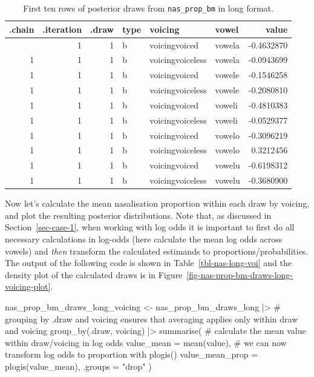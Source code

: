 \documentclass[
  authoryear,
  preprint,
  3p]{elsarticle}
\newenvironment{Shaded}{\begin{snugshade}}{\end{snugshade}}
\newcommand{\AttributeTok}[1]{\textcolor[rgb]{0.40,0.45,0.13}{#1}}
\newcommand{\CommentTok}[1]{\textcolor[rgb]{0.37,0.37,0.37}{#1}}
\newcommand{\FunctionTok}[1]{\textcolor[rgb]{0.28,0.35,0.67}{#1}}
\newcommand{\NormalTok}[1]{\textcolor[rgb]{0.00,0.23,0.31}{#1}}
\newcommand{\OtherTok}[1]{\textcolor[rgb]{0.00,0.23,0.31}{#1}}
\newcommand{\SpecialCharTok}[1]{\textcolor[rgb]{0.37,0.37,0.37}{#1}}
\newcommand{\StringTok}[1]{\textcolor[rgb]{0.13,0.47,0.30}{#1}}
\begin{document}
\begin{longtable}[]{@{}rrrlllr@{}}

\caption{\label{tbl-nas-draws}First ten rows of posterior draws from
\texttt{nas\_prop\_bm} in long format.}

\tabularnewline

\toprule\noalign{}
.chain & .iteration & .draw & type & voicing & vowel & value \\
\midrule\noalign{}
\endhead
\bottomrule\noalign{}
\endlastfoot
1 & 1 & 1 & b & voicingvoiced & vowela & -0.4632870 \\
1 & 1 & 1 & b & voicingvoiceless & vowela & -0.0943699 \\
1 & 1 & 1 & b & voicingvoiced & vowele & -0.1546258 \\
1 & 1 & 1 & b & voicingvoiceless & vowele & -0.2080810 \\
1 & 1 & 1 & b & voicingvoiced & voweli & -0.4810383 \\
1 & 1 & 1 & b & voicingvoiceless & voweli & -0.0529377 \\
1 & 1 & 1 & b & voicingvoiced & vowelo & -0.3096219 \\
1 & 1 & 1 & b & voicingvoiceless & vowelo & 0.3212456 \\
1 & 1 & 1 & b & voicingvoiced & vowelu & -0.6198312 \\
1 & 1 & 1 & b & voicingvoiceless & vowelu & -0.3680900 \\

\end{longtable}

Now let's calculate the mean nasalisation proportion within each draw by
voicing, and plot the resulting posterior distributions. Note that, as
discussed in Section~\ref{sec-case-1}, when working with log odds it is
important to first do all necessary calculations in log-odds (here
calculate the mean log odds across vowels) and \emph{then} transform the
calculated estimands to proportions/probabilities. The output of the
following code is shown in Table~\ref{tbl-nas-long-voi} and the density
plot of the calculated draws is in
Figure~\ref{fig-nas-prop-bm-draws-long-voicing-plot}.

\begin{Shaded}
\begin{Highlighting}[]
\NormalTok{nas\_prop\_bm\_draws\_long\_voicing }\OtherTok{\textless{}{-}}\NormalTok{ nas\_prop\_bm\_draws\_long }\SpecialCharTok{|\textgreater{}} 
  \CommentTok{\# grouping by .draw and voicing ensures that averaging applies only within draw and voicing}
  \FunctionTok{group\_by}\NormalTok{(.draw, voicing) }\SpecialCharTok{|\textgreater{}} 
  \FunctionTok{summarise}\NormalTok{(}
    \CommentTok{\# calculate the mean value within draw/voicing in log odds}
    \AttributeTok{value\_mean =} \FunctionTok{mean}\NormalTok{(value),}
    \CommentTok{\# we can now transform log odds to proportion with plogis()}
    \AttributeTok{value\_mean\_prop =} \FunctionTok{plogis}\NormalTok{(value\_mean),}
    \AttributeTok{.groups =} \StringTok{"drop"}
\NormalTok{  )}
\end{Highlighting}
\end{Shaded}
\end{document}

